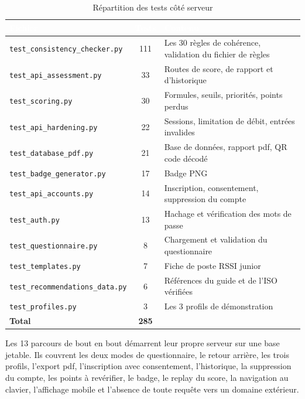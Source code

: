 \begin{table}[H]
  \centering
  \caption{Répartition des tests côté serveur}
  \label{tab:tests}
  \renewcommand{\arraystretch}{1.3}
  \small
  \begin{tabularx}{\textwidth}{|l|c|>{\raggedright\arraybackslash}X|}
    \hline
    \rowcolor{iacsTableHead}
    \textcolor{white}{\textbf{Fichier}} &
    \textcolor{white}{\textbf{Tests}} &
    \textcolor{white}{\textbf{Contenu}} \\
    \hline
    \texttt{test\_consistency\_checker.py} & 111 & Les 30 règles de cohérence, validation du fichier de règles \\
    \hline
    \rowcolor{iacsLightGray}
    \texttt{test\_api\_assessment.py} & 33 & Routes de score, de rapport et d'historique \\
    \hline
    \texttt{test\_scoring.py} & 30 & Formules, seuils, priorités, points perdus \\
    \hline
    \rowcolor{iacsLightGray}
    \texttt{test\_api\_hardening.py} & 22 & Sessions, limitation de débit, entrées invalides \\
    \hline
    \texttt{test\_database\_pdf.py} & 21 & Base de données, rapport \gls{pdf}, QR code décodé \\
    \hline
    \rowcolor{iacsLightGray}
    \texttt{test\_badge\_generator.py} & 17 & Badge PNG \\
    \hline
    \texttt{test\_api\_accounts.py} & 14 & Inscription, consentement, suppression du compte \\
    \hline
    \rowcolor{iacsLightGray}
    \texttt{test\_auth.py} & 13 & Hachage et vérification des mots de passe \\
    \hline
    \texttt{test\_questionnaire.py} & 8 & Chargement et validation du questionnaire \\
    \hline
    \rowcolor{iacsLightGray}
    \texttt{test\_templates.py} & 7 & Fiche de poste RSSI junior \\
    \hline
    \texttt{test\_recommendations\_data.py} & 6 & Références du guide et de l'ISO vérifiées \\
    \hline
    \rowcolor{iacsLightGray}
    \texttt{test\_profiles.py} & 3 & Les 3 profils de démonstration \\
    \hline
    \textbf{Total} & \textbf{285} & \\
    \hline
  \end{tabularx}
\end{table}

Les 13 parcours de bout en bout démarrent leur propre serveur sur une base jetable. Ils couvrent les deux modes de questionnaire, le retour arrière, les trois profils, l'export \gls{pdf}, l'inscription avec consentement, l'historique, la suppression du compte, les points à revérifier, le badge, le replay du score, la navigation au clavier, l'affichage mobile et l'absence de toute requête vers un domaine extérieur.

